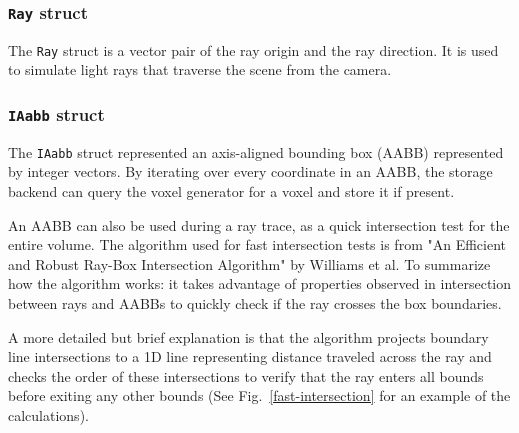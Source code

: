 \documentclass[conference]{IEEEtran}
\begin{document}
\cprotect\subsubsection{\verb|Ray| struct}

The \verb|Ray| struct is a vector pair of the ray origin and the ray direction.
It is used to simulate light rays that traverse the scene from the camera.

\cprotect\subsubsection{\verb|IAabb| struct}

The \verb|IAabb| struct represented an axis-aligned bounding box (AABB) represented by integer vectors.
By iterating over every coordinate in an AABB, the storage backend can query the voxel generator for a voxel and store it if present.

An AABB can also be used during a ray trace, as a quick intersection test for the entire volume.
The algorithm used for fast intersection tests is from "An Efficient and Robust Ray-Box Intersection Algorithm" by Williams et al. \cite{williams}
To summarize how the algorithm works: it takes advantage of properties observed in intersection between rays and AABBs to quickly check if the ray crosses the box boundaries.

A more detailed but brief explanation is that the algorithm projects boundary line intersections to a 1D line representing distance traveled across the ray and checks the order of these intersections to verify that the ray enters all bounds before exiting any other bounds (See Fig.~\ref{fast-intersection} for an example of the calculations).
\end{document}
